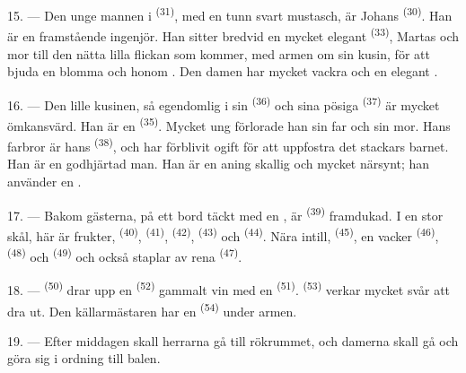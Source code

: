 15. --- Den unge mannen i  \textsuperscript{(31)}, med en tunn
svart mustasch, är Johans  \textsuperscript{(30)}. Han är en
framstående ingenjör. Han sitter bredvid en mycket elegant 
\textsuperscript{(33)}, Martas  och mor till den nätta lilla
flickan som kommer, med armen om sin kusin, för att bjuda en blomma och
 honom . Den damen har mycket vackra
 och en elegant .

16. --- Den lille kusinen, så egendomlig i sin 
\textsuperscript{(36)} och sina pösiga  \textsuperscript{(37)} är
mycket ömkansvärd. Han är en  \textsuperscript{(35)}. Mycket
ung förlorade han sin far och sin mor. Hans farbror är hans 
\textsuperscript{(38)}, och har förblivit ogift för att uppfostra det stackars
barnet. Han är en godhjärtad man. Han är en aning skallig och mycket närsynt;
han använder en .

\VUsaut{2.4mm}
\VUsaut{3.0mm}

17. --- Bakom gästerna, på ett bord täckt med en , är
 \textsuperscript{(39)} framdukad. I en stor skål, här är
frukter,  \textsuperscript{(40)}, 
\textsuperscript{(41)},  \textsuperscript{(42)},
 \textsuperscript{(43)} och 
\textsuperscript{(44)}. Nära intill, 
\textsuperscript{(45)}, en vacker  \textsuperscript{(46)},
 \textsuperscript{(48)} och 
\textsuperscript{(49)} och också staplar av rena 
\textsuperscript{(47)}.

18. ---  \textsuperscript{(50)} drar upp en 
\textsuperscript{(52)} gammalt vin med en 
\textsuperscript{(51)}.  \textsuperscript{(53)} verkar mycket
svår att dra ut. Den källarmästaren har en 
\textsuperscript{(54)} under armen.

19. --- Efter middagen skall herrarna gå till rökrummet, och damerna skall gå
och göra sig i ordning till balen.

\VUsaut{5.0mm}
\VUsaut{1.6mm}
\VUsaut{2.6mm}

